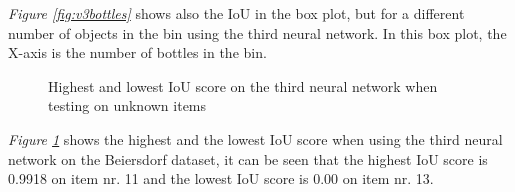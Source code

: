 \textit{Figure \ref{fig:v3bottles}} shows also the IoU in the box plot, but for a different number of objects in the bin using the third neural network. In this box plot, the X-axis is the number of bottles in the bin. %

\begin{figure}[h]
    \centering
    \hfill
    
    \caption{Highest and lowest IoU score on the third neural network when testing on unknown items}
    \label{fig:v3unknowniou2}
\end{figure}

\textit{Figure \ref{fig:v3unknowniou2}} shows the highest and the lowest IoU score when using the third neural network on the Beiersdorf dataset, it can be seen that the highest IoU score is 0.9918 on item nr. 11 and the lowest IoU score is 0.00 on item nr. 13.

